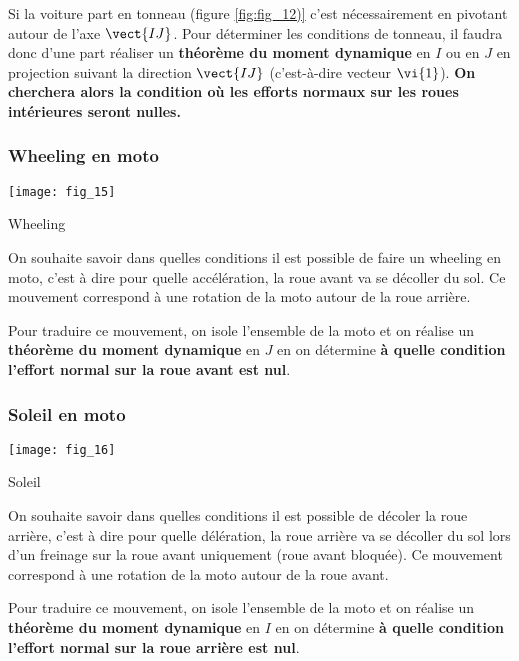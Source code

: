 Si la voiture part en tonneau (figure \ref{fig:fig_12)} c'est nécessairement en pivotant autour de l'axe $\vect{IJ}$. Pour déterminer les conditions de tonneau, il faudra donc d'une part réaliser un \textbf{théorème du moment dynamique} en $I$ ou en $J$ en projection suivant la direction $\vect{IJ}$ (c'est-à-dire vecteur $\vi{1}$). 
\textbf{On cherchera alors la condition où les efforts normaux sur les roues intérieures seront nulles.}



\subsubsection{Wheeling en moto}

\begin{marginfigure}
\texttt{[image: fig\_15]}
\caption{Wheeling \label{fig:fig_15}}
\end{marginfigure} 

On souhaite savoir dans quelles conditions il est possible de faire un wheeling en moto, c'est à dire pour quelle accélération, la roue avant va se décoller du sol. 
Ce mouvement correspond à une rotation de la moto autour de la roue arrière.

Pour traduire ce mouvement, on isole l'ensemble de la moto et on réalise un \textbf{théorème du moment dynamique} en $J$ en on détermine \textbf{à quelle condition l'effort normal sur la roue avant est nul}.



\subsubsection{Soleil en moto}

\begin{marginfigure}
\texttt{[image: fig\_16]}
\caption{Soleil \label{fig:fig_16}}
\end{marginfigure} 

On souhaite savoir dans quelles conditions il est possible de décoler la roue arrière, c'est à dire pour quelle délération, la roue arrière va se décoller du sol lors d'un freinage sur la roue avant uniquement (roue avant bloquée).
Ce mouvement correspond à une rotation de la moto autour de la roue avant.

Pour traduire ce mouvement, on isole l'ensemble de la moto et on réalise un \textbf{théorème du moment dynamique} en $I$ en on détermine \textbf{à quelle condition l'effort normal sur la roue arrière est nul}.

